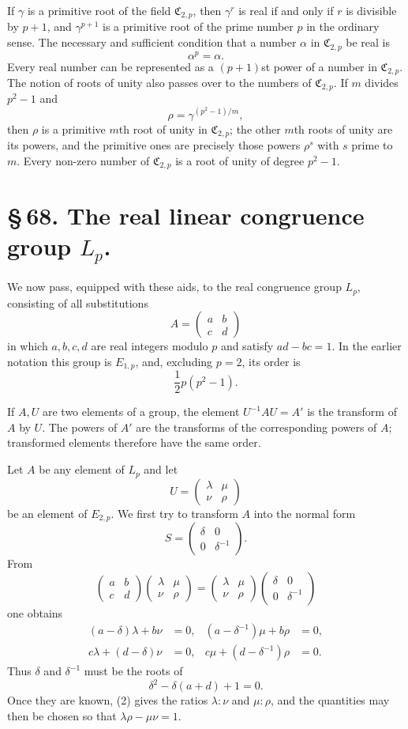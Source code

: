 \documentclass[11pt]{article}
\providecommand{\mat}[4]{\begin{pmatrix}#1&#2\\#3&#4\end{pmatrix}}
\providecommand{\mat}[4]{\begin{pmatrix}#1&#2\\#3&#4\end{pmatrix}}
\providecommand{\Cfield}{\mathfrak C}
\providecommand{\mat}[1]{\begin{pmatrix}#1\end{pmatrix}}
\begin{document}
If $\gamma$ is a primitive root of the field $\Cfield_{2,p}$, then $\gamma^r$ is real if and only if $r$ is divisible by $p+1$, and $\gamma^{p+1}$ is a primitive root of the prime number $p$ in the ordinary sense. The necessary and sufficient condition that a number $\alpha$ in $\Cfield_{2,p}$ be real is
\[
 \alpha^p=\alpha .
\]
Every real number can be represented as a $(p+1)$st power of a number in $\Cfield_{2,p}$. The notion of roots of unity also passes over to the numbers of $\Cfield_{2,p}$. If $m$ divides $p^2-1$ and
\[
 \rho=\gamma^{(p^2-1)/m},
\]
then $\rho$ is a primitive $m$th root of unity in $\Cfield_{2,p}$; the other $m$th roots of unity are its powers, and the primitive ones are precisely those powers $\rho^s$ with $s$ prime to $m$. Every non-zero number of $\Cfield_{2,p}$ is a root of unity of degree $p^2-1$.

\section*{\S\,68. The real linear congruence group $L_p$.}

We now pass, equipped with these aids, to the real congruence group $L_p$, consisting of all substitutions
\[
 A=\mat{a}{b}{c}{d}
\]
in which $a,b,c,d$ are real integers modulo $p$ and satisfy $ad-bc=1$. In the earlier notation this group is $E_{1,p}$, and, excluding $p=2$, its order is
\[
 \frac12 p(p^2-1).
\]

If $A,U$ are two elements of a group, the element $U^{-1}AU=A'$ is the transform of $A$ by $U$. The powers of $A'$ are the transforms of the corresponding powers of $A$; transformed elements therefore have the same order.

Let $A$ be any element of $L_p$ and let
\[
 U=\mat{\lambda}{\mu}{\nu}{\rho}
\]
be an element of $E_{2,p}$. We first try to transform $A$ into the normal form
\begin{equation}
 S=\mat{\delta}{0}{0}{\delta^{-1}} .
 \tag{1}
\end{equation}
From
\[
 \mat{a}{b}{c}{d}\mat{\lambda}{\mu}{\nu}{\rho}
 =\mat{\lambda}{\mu}{\nu}{\rho}\mat{\delta}{0}{0}{\delta^{-1}}
\]
one obtains
\begin{equation}
\begin{aligned}
 (a-\delta)\lambda+b\nu&=0,&
 (a-\delta^{-1})\mu+b\rho&=0,\\
 c\lambda+(d-\delta)\nu&=0,&
 c\mu+(d-\delta^{-1})\rho&=0.
\end{aligned}
\tag{2}
\end{equation}
Thus $\delta$ and $\delta^{-1}$ must be the roots of
\begin{equation}
 \delta^2-\delta(a+d)+1=0.
 \tag{3}
\end{equation}
Once they are known, (2) gives the ratios $\lambda:\nu$ and $\mu:\rho$, and the quantities may then be chosen so that $\lambda\rho-\mu\nu=1$.
\end{document}
